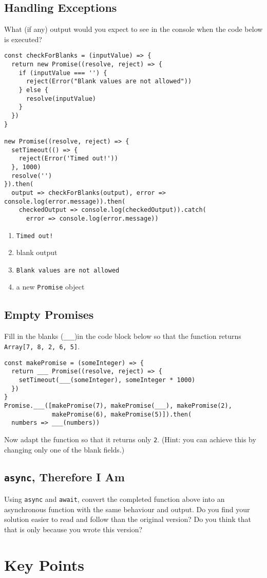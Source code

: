 \subsection*{Handling Exceptions}
What (if any) output would you expect to see in the console
when the code below is executed?

\begin{verbatim}
const checkForBlanks = (inputValue) => {
  return new Promise((resolve, reject) => {
    if (inputValue === '') {
      reject(Error("Blank values are not allowed"))
    } else {
      resolve(inputValue)
    }
  })
}

new Promise((resolve, reject) => {
  setTimeout(() => {
    reject(Error('Timed out!'))
  }, 1000)
  resolve('')
}).then(
  output => checkForBlanks(output), error => console.log(error.message)).then(
    checkedOutput => console.log(checkedOutput)).catch(
      error => console.log(error.message))
\end{verbatim}

\begin{enumerate}
\item
  \texttt{Timed\ out!}
\item
  blank output
\item
  \texttt{Blank\ values\ are\ not\ allowed}
\item
  a new \texttt{Promise} object
\end{enumerate}

\subsection*{Empty Promises}
Fill in the blanks (\texttt{\_\_\_})in the code block below so that
the function returns \texttt{Array{[}7,\ 8,\ 2,\ 6,\ 5{]}}.

\begin{verbatim}
const makePromise = (someInteger) => {
  return ___ Promise((resolve, reject) => {
    setTimeout(___(someInteger), someInteger * 1000)
  })
}
Promise.___([makePromise(7), makePromise(___), makePromise(2),
             makePromise(6), makePromise(5)]).then(
  numbers => ___(numbers))
\end{verbatim}

Now adapt the function so that it returns only \texttt{2}.
(Hint: you can achieve this by changing only one of the blank fields.)

\subsection*{\texttt{async}, Therefore I Am}
Using \texttt{async} and \texttt{await},
convert the completed function above into an asynchronous function with the same behaviour and output.
Do you find your solution easier to read and follow than the original version?
Do you think that that is only because you wrote this version?

\section*{Key Points}


